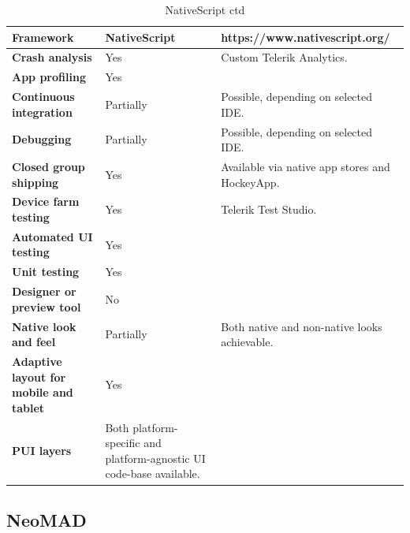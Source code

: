 \documentclass[english,master,public,dept460,male,cpdeclaration,oneside]{diploma}
\begin{document}
\begin{table}[!h]
	\centering
	\caption{NativeScript ctd}
	\begin{tabular}{p{} | p{} | p{}}
		\toprule		
		\textbf{Framework} & \textbf{NativeScript} & https://www.nativescript.org/ \\
		\midrule
		\textbf{Crash analysis} & Yes & Custom Telerik Analytics. \\			
		\midrule
		\textbf{App profiling} & Yes & \\			
		\midrule
		\textbf{Continuous integration} & Partially & Possible, depending on selected IDE. \\			
		\midrule
		\textbf{Debugging} & Partially & Possible, depending on selected IDE. \\			
		\midrule
		\textbf{Closed group shipping} & Yes & Available via native app stores and HockeyApp. \\			
		\midrule
		\textbf{Device farm testing} & Yes & Telerik Test Studio. \\			
		\midrule
		\textbf{Automated UI testing} & Yes & \\			
		\midrule
		\textbf{Unit testing} & Yes & \\			
		\midrule
		\textbf{Designer or preview tool} & No & \\			
		\midrule
		\textbf{Native look and feel} & Partially & Both native and non-native looks achievable. \\			
		\midrule
		\textbf{Adaptive layout for mobile and tablet} & Yes & \\			
		\midrule		
		\textbf{PUI layers} & Both platform-specific and platform-agnostic UI code-base available. &  \\			
		\midrule
	\end{tabular}
\end{table}

\clearpage
\subsection{NeoMAD}
\end{document}
